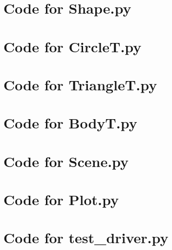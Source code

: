 \documentclass[12pt]{article}
\begin{document}
\newpage

\lstset{language=Python, basicstyle=\tiny, breaklines=true, showspaces=false,
  showstringspaces=false, breakatwhitespace=true}

\def\thesection{\Alph{section}}

\section{Code for Shape.py}

\noindent 

\newpage

\section{Code for CircleT.py}

\noindent 

\newpage

\section{Code for TriangleT.py}

\noindent 

\newpage

\section{Code for BodyT.py}

\noindent 

\newpage

\section{Code for Scene.py}

\noindent 

\newpage

\section{Code for Plot.py}

\noindent 

\newpage

\section{Code for test\_driver.py}
\end{document}

